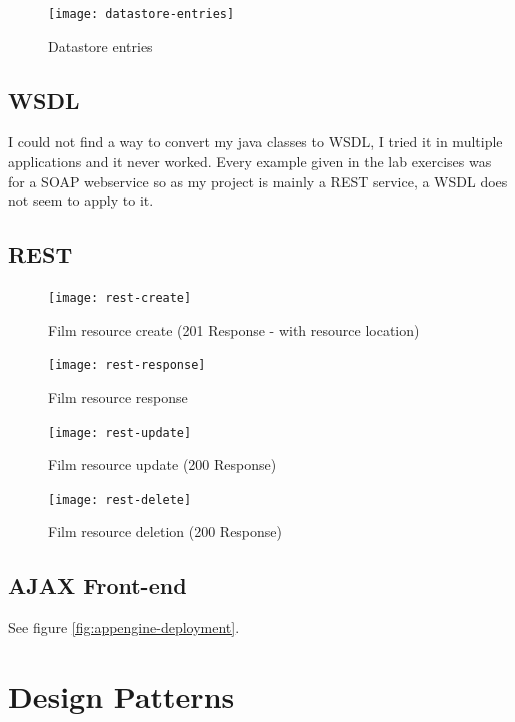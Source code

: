 \documentclass[12pt]{article}
\begin{document}
    \begin{figure}[H]
      \centering
      \texttt{[image: datastore-entries]}
      \caption{Datastore entries}
      \label{fig:datastore-entries}
    \end{figure}

  \subsection{WSDL}
    I could not find a way to convert my java classes to WSDL, I tried it in multiple applications and it never worked. Every example given in the lab exercises was for a SOAP webservice so as my project is mainly a REST service, a WSDL does not seem to apply to it.

  \subsection{REST}
    \begin{figure}[H]
      \centering
      \texttt{[image: rest-create]}
      \caption{Film resource create (201 Response - with resource location)}
      \label{fig:rest-create}
    \end{figure}

    \begin{figure}[H]
      \centering
      \texttt{[image: rest-response]}
      \caption{Film resource response}
      \label{fig:rest-response}
    \end{figure}

    \begin{figure}[H]
      \centering
      \texttt{[image: rest-update]}
      \caption{Film resource update (200 Response)}
      \label{fig:rest-update}
    \end{figure}

    \begin{figure}[H]
      \centering
      \texttt{[image: rest-delete]}
      \caption{Film resource deletion (200 Response)}
      \label{fig:rest-delete}
    \end{figure}

  \subsection{AJAX Front-end}
    See figure \ref{fig:appengine-deployment}.

\section{Design Patterns}
\end{document}
